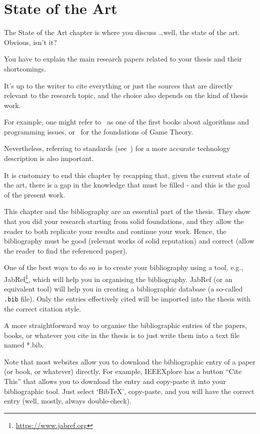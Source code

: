 
\chapter{State of the Art}
\label{cap:stateOfArt}
The State of the Art chapter is where you discuss \ldots well, the state of the art. Obvious, isn't it?

You have to explain the main research papers related to your thesis and their shortcomings.

It's up to the writer to cite everything or just the sources that are directly relevant to the research topic, and the choice also depends on the kind of thesis work.

For example, one might refer to~\cite{knuth97} as one of the first books about algorithms and programming issues, or~\cite{nash51} for the foundations of Game Theory.

Nevertheless, referring to standards (see~\cite{rfc1925}) for a more accurate technology description is also important.

It is customary to end this chapter by recapping that, given the current state of the art, there is a gap in the knowledge that must be filled - and this is the goal of the present work.

This chapter and the bibliography are an essential part of the thesis. They show that you did your research starting from solid foundations, and they allow the reader to both replicate your results and continue your work.
Hence, the bibliography must be good (relevant works of solid reputation) and correct (allow the reader to find the referenced paper).

One of the best ways to do so is to create your bibliography using a tool, e.g., JabRef\footnote{\url{https://www.jabref.org}}, which will help you in organising the bibliography. JabRef (or an equivalent tool) will help you in creating a bibliographic database (a so-called \texttt{.bib} file). Only the entries effectively cited will be imported into the thesis with the correct citation style.

A more straightforward way to organise the bibliographic entries of the papers, books, or whatever you cite in the thesis is to just write them into a text file named *.bib.

Note that most websites allow you to download the bibliographic entry of a paper (or book, or whatever) directly. For example, IEEEXplore has a button ``Cite This'' that allows you to download the entry and copy-paste it into your bibliographic tool. Just select `BibTeX', copy-paste, and you will have the correct entry (well, mostly, always double-check).